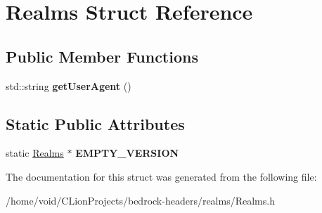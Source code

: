 \hypertarget{struct_realms}{}\section{Realms Struct Reference}
\label{struct_realms}
\subsection*{Public Member Functions}
\begin{DoxyCompactItemize}
\item 
\mbox{\label{struct_realms_abc6147c7deda313b9921d8c39e1ad6a1}} 
std\+::string {\bfseries get\+User\+Agent} ()
\end{DoxyCompactItemize}
\subsection*{Static Public Attributes}
\begin{DoxyCompactItemize}
\item 
\mbox{\label{struct_realms_ada6cde4b273885258ca33a254cc792ac}} 
static \mbox{\hyperlink{struct_realms}{Realms}} $\ast$ {\bfseries E\+M\+P\+T\+Y\+\_\+\+V\+E\+R\+S\+I\+ON}
\end{DoxyCompactItemize}


The documentation for this struct was generated from the following file\+:\begin{DoxyCompactItemize}
\item 
/home/void/\+C\+Lion\+Projects/bedrock-\/headers/realms/Realms.\+h\end{DoxyCompactItemize}
